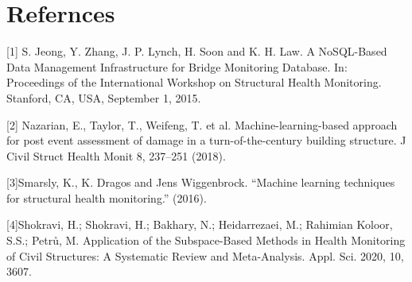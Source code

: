 \documentclass{article}
\begin{document}
\normalsize
\section{Refernces}

[1] S. Jeong, Y. Zhang, J. P. Lynch, H. Soon and K. H. Law. A NoSQL-Based Data Management Infrastructure for Bridge Monitoring Database. In: Proceedings of the International Workshop on Structural Health Monitoring. Stanford, CA, USA, September 1, 2015.

[2] Nazarian, E., Taylor, T., Weifeng, T. et al. Machine-learning-based approach for post event assessment of damage in a turn-of-the-century building structure. J Civil Struct Health Monit 8, 237–251 (2018).

[3]Smarsly, K., K. Dragos and Jens Wiggenbrock. “Machine learning techniques for structural health monitoring.” (2016).

[4]Shokravi, H.; Shokravi, H.; Bakhary, N.; Heidarrezaei, M.; Rahimian Koloor, S.S.; Petrů, M. Application of the Subspace-Based Methods in Health Monitoring of Civil Structures: A Systematic Review and Meta-Analysis. Appl. Sci. 2020, 10, 3607.
\end{document}
